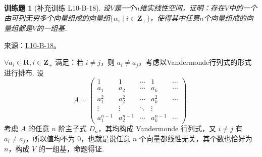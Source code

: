 \documentclass[12pt,fontset=fandol]{ctexart}
\newtheorem{exercise}{训练题}[section]
\begin{document}
\begin{exercise}[补充训练 L10-B-18]\label{prob:L10-B-18}
设$V$是一个$n$维实线性空间，证明：存在$V$中的一个由可列无穷多个向量组成的向量组$\{\alpha_i \mid i\in\mathbf{Z}_+\}$，使得其中任意$n$个向量组成的向量组都是$V$的一组基.
\end{exercise}
\noindent 来源：\href{https://github.com/yhwu-is/Linear-Algebra-Left-Undone/blob/new/%E8%AE%B2%E4%B9%89/%E4%B8%93%E9%A2%98/10%20%E8%A1%8C%E5%88%97%E5%BC%8F.tex}{L10-B-18}。
\begin{solve}
$\forall a_i \in \mathbf{R}, i \in \mathbf{Z}_{+}$ 满足：若 $i \neq j$，则 $a_i \neq a_j$，考虑以Vandermonde行列式的形式进行排布. 设
            \[ A = \begin{pmatrix}
                    1         & 1         & \cdots & 1         & \cdots \\
                    a_1       & a_2       & \cdots & a_k       & \cdots \\
                    a_1^2     & a_2^2     & \cdots & a_k^2     & \cdots \\
                    \vdots    & \vdots    & \ddots & \vdots    &        \\
                    a_1^{n-1} & a_2^{n-1} & \cdots & a_k^{n-1} & \cdots
                \end{pmatrix}.\]
            考虑 $A$ 的任意 $n$ 阶主子式 $D_n$，其均构成 Vandermonde 行列式，又 $i \neq j$ 有 $a_i \neq a_j$，所以值均不为 0，也就是说任意 $n$ 个向量都线性无关，其个数也恰好为 $n$，构成 $V$ 的一组基，命题得证.
\end{solve}
\end{document}
